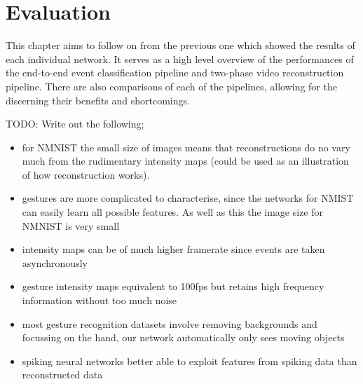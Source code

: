 \chapter{Evaluation} \label{chap:evaluation}

This chapter aims to follow on from the previous one which showed the results of each individual network. It serves as a high level overview of the performances of the end-to-end event classification pipeline and two-phase video reconstruction pipeline. There are also comparisons of each of the pipelines, allowing for the discerning their benefits and shortcomings.

\color{red} TODO: Write out the following;

\begin{itemize}
    \item for NMNIST the small size of images means that reconstructions do no vary much from the rudimentary intensity maps (could be used as an illustration of how reconstruction works).
    \item gestures are more complicated to characterise, since the networks for NMIST can easily learn all possible features. As well as this the image size for NMNIST is very small
    \item intensity maps can be of much higher framerate since events are taken asynchronously
    \item gesture intensity maps equivalent to 100fps but retains high frequency information without too much noise
    \item most gesture recognition datasets involve removing backgrounds and focussing on the hand, our network automatically only sees moving objects
    \item spiking neural networks better able to exploit features from spiking data than reconstructed data
\end{itemize}

\color{black}